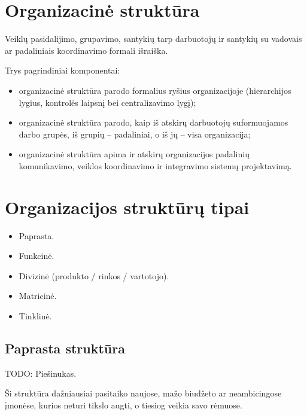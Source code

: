 \section{Organizacinė struktūra}

\begin{defn}
  Veiklų pasidalijimo, grupavimo, santykių tarp darbuotojų ir santykių
  su vadovais ar padaliniais koordinavimo formali išraiška.
\end{defn}

Trys pagrindiniai komponentai:
\begin{itemize}
  \item organizacinė struktūra parodo formalius ryšius organizacijoje
    (hierarchijos lygius, kontrolės laipsnį bei centralizavimo lygį);
  \item organizacinė struktūra parodo, kaip iš atskirų darbuotojų
    suformuojamos darbo grupės, iš grupių – padaliniai, o iš jų –
    visa organizacija;
  \item organizacinė struktūra apima ir atskirų organizacijos padalinių
    komunikavimo, veiklos koordinavimo ir integravimo sistemų projektavimą.
\end{itemize}

\section{Organizacijos struktūrų tipai}

\begin{itemize}
  \item Paprasta.
  \item Funkcinė.
  \item Divizinė (produkto / rinkos / vartotojo).
  \item Matricinė.
  \item Tinklinė.
\end{itemize}

\subsection{Paprasta struktūra}

TODO: Piešinukas.

Ši struktūra dažniausiai pasitaiko naujose, mažo biudžeto ar
neambicingose įmonėse, kurios neturi tikslo augti, o tiesiog veikia
savo rėmuose.

